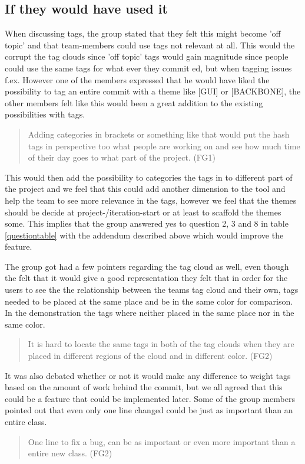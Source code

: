 \subsection{If they would have used it}
When discussing tags, the group stated that they felt this might become 'off topic' and that team-members could use tags not relevant at all. This would the corrupt the tag clouds since 'off topic' tags would gain magnitude since people could use the same tags for what ever they commit ed, but when tagging issues f.ex. However one of the members expressed that he would have liked the possibility to tag an entire commit with a theme like [GUI] or [BACKBONE], the other members felt like this would been a great addition to the existing possibilities with tags.
\begin{quote}
Adding categories in brackets or something like that would put the hash tags in perspective too what people are working on and see how much time of their day goes to what part of the project. (FG1)
\end{quote}
This would then add the possibility to categories the tags in to different part of the project and we feel that this could add another dimension to the tool and help the team to see more relevance in the tags, however we feel that the themes should be decide at project-/iteration-start or at least to scaffold the themes some. This implies that the group answered yes to question 2, 3 and 8 in table \ref{questiontable} with the addendum described above which would improve the feature.

The group got had a few pointers regarding the tag cloud as well, even though the felt that it would give a good representation they felt that in order for the users to see the the relationship between the teams tag cloud and their own, tags needed to be placed at the same place and be in the same color for comparison. In the demonstration the tags where neither placed in the same place nor in the same color. 
\begin{quote}
    It is hard to locate the same tags in both of the tag clouds when they are placed in different regions of the cloud and in different color. (FG2)
\end{quote}
It was also debated whether or not it would make any difference to weight tags based on the amount of work behind the commit, but we all agreed that this could be a feature that could be implemented later. Some of the group members pointed out that even only one line changed could be just as important than an entire class.
\begin{quote}
    One line to fix a bug, can be as important or even more important than a entire new class. (FG2)
\end{quote}


